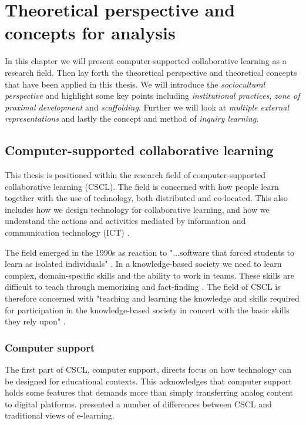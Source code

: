\chapter{Theoretical perspective and concepts for analysis}

In this chapter we will present computer-supported collaborative learning as a research field. Then lay forth the theoretical perspective and theoretical concepts that have been applied in this thesis. We will introduce the \emph{sociocultural perspective} and highlight some key points including \emph{institutional practices}, \emph{zone of proximal development} and \emph{scaffolding}. Further we will look at \emph{multiple external representations} and lastly the concept and method of \emph{inquiry learning}.

\section{Computer-supported collaborative learning}
This thesis is positioned within the research field of computer-supported collaborative learning (CSCL). The field is concerned with how people learn together with the use of technology, both distributed and co-located. This also includes how we design technology for collaborative learning, and how we understand the actions and activities mediated by information and communication technology (ICT) \citep{stahl2006computer,ludvigsen2010computer}.  

The field emerged in the 1990s as reaction to "...software that forced students to learn as isolated individuals" \citep{stahl2006computer}. In a knowledge-based society we need to learn complex, domain-specific skills and the ability to work in teams. These skills are difficult to teach through memorizing and fact-finding \citep{sfard1998two,ludvigsen2010computer}. The field of CSCL is therefore concerned with "teaching and learning the knowledge and skills required for participation in the knowledge-based society in concert with the basic skills they rely upon" \citep[p. 2]{ludvigsen2010computer}.

\subsection{Computer support}
The first part of CSCL, computer support, directs focus on how technology can be designed for educational contexts. This acknowledges that computer support holds some features that demands more than simply transferring analog content to digital platforms. \citet{stahl2006computer} presented a number of differences between CSCL and traditional views of e-learning. 

